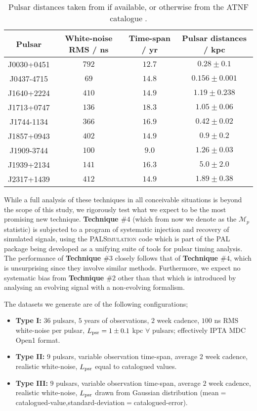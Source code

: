 \documentclass[twocolappendix,tighten]{emulateapj}
\begin{document}
\begin{table*}
\caption{\label{tab:9PsrInfo}Pulsar distances taken from \citet{verbiest-psr-distances} if available, or otherwise from the ATNF catalogue \citep{ATNF-cat}.}
\centering
\begin{tabular}{c c c c}
\hline
Pulsar & White-noise RMS / ns & Time-span / yr & Pulsar distances / kpc\\
\hline
J0030+0451 & $792$ & $12.7$ & $0.28\pm0.1$ \\
J0437-4715 & $69$ & $14.8$ & $0.156\pm0.001$ \\
J1640+2224 & $410$ & $14.9$ & $1.19\pm0.238$ \\
J1713+0747 & $136$ & $18.3$ & $1.05\pm0.06$ \\
J1744-1134 & $366$ & $16.9$ & $0.42\pm0.02$ \\
J1857+0943 & $402$ & $14.9$ & $0.9\pm0.2$ \\
J1909-3744 & $100$ & $9.0$ & $1.26\pm0.03$ \\
J1939+2134 & $141$ & $16.3$ & $5.0\pm2.0$ \\
J2317+1439 & $412$ & $14.9$ & $1.89\pm0.38$ \\
\hline
\end{tabular}
\end{table*}

While a full analysis of these techniques in all conceivable situations is beyond the scope of this study, we rigorously test what we expect to be the most promising new technique. {\bf Technique $\#4$} (which from now we denote as the {\bf $\mathcal{M}_p$} statistic) is subjected to a program of systematic injection and recovery of simulated signals, using the \textsc{PALSimulation} code which is part of the \textsc{PAL} package \citep{PAL-site} being developed as a unifying suite of tools for pulsar timing analysis. The performance of {\bf Technique $\#3$} closely follows that of {\bf Technique $\#4$}, which is unsurprising since they involve similar methods. Furthermore, we expect no systematic bias from {\bf Technique $\#2$} other than that which is introduced by analysing an evolving signal with a non-evolving formalism.

The datasets we generate are of the following configurations;

\begin{itemize}

\item {\bf Type I:} $36$ pulsars, $5$ years of observations, $2$ week cadence, $100$ ns RMS white-noise per pulsar, $L_{\rm psr}=1\pm0.1$ kpc $\forall$ pulsars; effectively IPTA MDC Open1 format.

\item {\bf Type II:} $9$ pulsars, variable observation time-span, average $2$ week cadence, realistic white-noise, $L_{\rm psr}$ equal to catalogued values.

\item {\bf Type III:} $9$ pulsars, variable observation time-span, average $2$ week cadence, realistic white-noise, $L_{\rm psr}$ drawn from Gaussian distribution (mean$=$catalogued-value,standard-deviation$=$catalogued-error).

\end{itemize}
\end{document}
